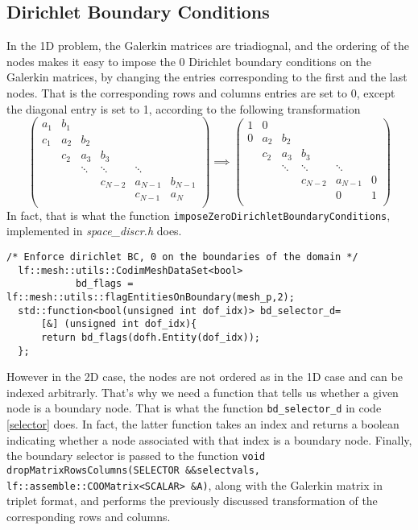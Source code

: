 \subsection{Dirichlet Boundary Conditions}
In the 1D problem, the Galerkin matrices are triadiognal, and the ordering of the nodes makes it easy to impose the 0 Dirichlet boundary conditions on the Galerkin matrices, by changing the entries corresponding to the first and the last nodes. That is the corresponding rows and columns entries are set to 0, except the diagonal entry is set to 1, according to the following transformation
\[
	\begin{pmatrix}
	 a_1& b_1 \\ 
	 c_1   & a_2 & b_2 & \\ 
	 & c_2 & a_3 & b_3\\ 
	 & & \ddots& \ddots & \ddots \\
	 & & & c_{N-2}&  a_{N-1} & b_{N-1}\\
	 & & & & c_{N-1} & a_{N} \\  
	\end{pmatrix}
	\implies
		\begin{pmatrix}
	 1 & 0 \\ 
	 0  & a_2 & b_2 \\ 
	  & c_2 & a_3 & b_3\\ 
	 & & \ddots& \ddots & \ddots \\
	 & & & c_{N-2}&  a_{N-1} & 0\\
	 & & & & 0 & 1 \\  
	\end{pmatrix}
\]
In fact, that is what the function \lstinline{imposeZeroDirichletBoundaryConditions}, implemented in \textit{space\_discr.h} does.
\begin{lstlisting}[caption={Boundary edge selector.}, label={selector}]
/* Enforce dirichlet BC, 0 on the boundaries of the domain */
  lf::mesh::utils::CodimMeshDataSet<bool>
    		bd_flags = lf::mesh::utils::flagEntitiesOnBoundary(mesh_p,2); 
  std::function<bool(unsigned int dof_idx)> bd_selector_d=
      [&] (unsigned int dof_idx){
      return bd_flags(dofh.Entity(dof_idx));
  };
\end{lstlisting}
However in the 2D case, the nodes are not ordered as in the 1D case and can be indexed arbitrarly. That's why we need a function that tells us whether a given node is a boundary node. That is what the function \lstinline{bd_selector_d} in code \eqref{selector} does. In fact, the latter function takes an index and returns a boolean indicating whether a node associated with that index is a boundary node. Finally, the boundary selector is passed to the function \lstinline{void dropMatrixRowsColumns(SELECTOR &&selectvals, lf::assemble::COOMatrix<SCALAR> &A)}, along with the Galerkin matrix in triplet format, and performs the previously discussed transformation of the corresponding rows and columns.  

